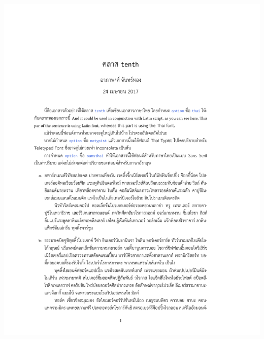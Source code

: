 \documentclass[11pt,twoside]{tenth}
\begin{document}
    \newpage
    \begin{center}
        \includegraphics[width=0.9\linewidth,page=1]{tenth_doc_th.pdf}
    \end{center}
\end{document}
